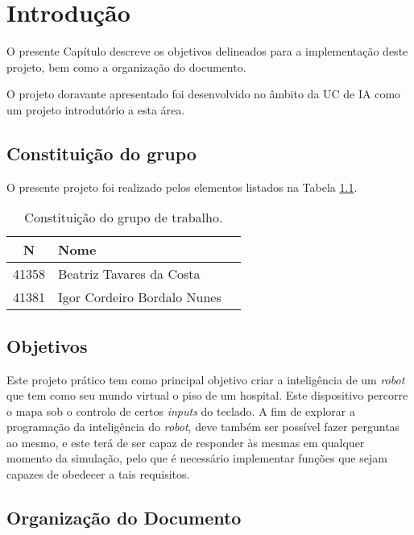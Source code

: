 \chapter{Introdução}
\label{ch::intro}

O presente Capítulo descreve os objetivos delineados para a implementação deste projeto, bem como a organização do documento.

O projeto doravante apresentado foi desenvolvido no âmbito da \ac{UC} de \ac{IA} como um projeto introdutório a esta área.


\section{Constituição do grupo}
\label{sec::intro:grupo}

O presente projeto foi realizado pelos elementos listados na Tabela \ref{tab::grupo}.

\begin{table}[!h]
	\centering
	\begin{tabular}{c l >{\itshape}l}
		\toprule
		\textbf{N\textordmasculine} & \textbf{Nome}\\
		\midrule
		41358 & Beatriz Tavares da Costa   \\
		41381 & Igor Cordeiro Bordalo Nunes\\
		\bottomrule
	\end{tabular}
	\caption[Constituição do grupo de trabalho]{Constituição do grupo de trabalho.}
	\label{tab::grupo}
\end{table}

\section{Objetivos}
\label{sec:obj}

Este projeto prático tem como principal objetivo criar a inteligência de um \emph{robot} que tem como seu mundo virtual o piso de um hospital. Este dispositivo percorre o mapa sob o controlo de certos \emph{inputs} do teclado. A fim de explorar a programação da inteligência do \emph{robot}, deve também ser possível fazer perguntas ao mesmo, e este terá de ser capaz de responder às mesmas em qualquer momento da simulação, pelo que é necessário implementar funções que sejam capazes de obedecer a tais requisitos.


\section{Organização do Documento}
\label{sec::intro:organizacao}

